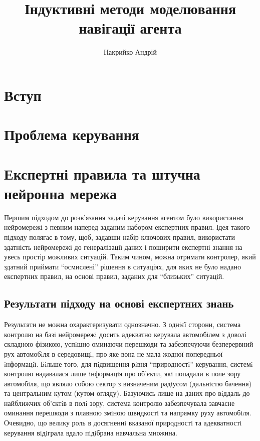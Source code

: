 \documentclass[a4paper,10pt]{article}
\title{Індуктивні методи моделювання навігації агента}
\author{Накрийко Андрій}
\begin{document}
\maketitle

\begin{abstract}

\end{abstract}

\section{Вступ}
\section{Проблема керування}
\section{Експертні правила та штучна нейронна мережа}
Першим підходом до розв'язання задачі керування агентом було використання нейромережі з певним наперед заданим набором експертних правил. Ідея такого підходу полягає в тому, щоб, задавши набір ключових правил, використати здатність нейромережі до генералізації даних і поширити експертні знання на увесь простір можливих ситуацій. Таким чином, можна отримати контролер, який здатний приймати ``осмислені'' рішення в ситуаціях, для яких не було надано експертних правил, на основі правил, заданих для ``близьких'' ситуацій. 
\subsection{Результати підходу на основі експертних знань}

Результати не можна охарактеризувати однозначно. З однiєї сторони, система контролю на базi нейромережi досить адекватно керувала автомобiлем з доволі складною фізикою, успiшно оминаючи перешкоди та забезпечуючи безперервний рух автомобiля в середовищi, про яке вона не мала жодної попередньої iнформацiї. Бiльше того, для пiдвищення рiвня “природностi” керування, системi контролю надавалася лише iнформацiя про об’єкти, якi попадали в поле зору автомобiля, що являло собою сектор з визначеним радiусом (дальнiстю бачення) та центральним кутом (кутом огляду). Базуючись лише на даних про вiддаль до найближчих об’єктiв в полi зору, система контролю забезпечувала завчасне оминання перешкоди з плавною змiною швидкостi та напрямку руху автомобiля. Очевидно, що велику роль в досягненнi вказаної природностi та адекватностi керування вiдiграла вдало пiдiбрана навчальна множина.
     
\end{document}
